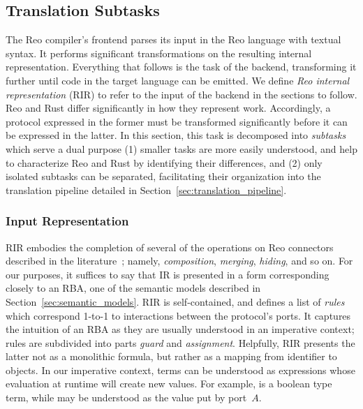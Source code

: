 \subsection{Translation Subtasks}
\label{sec:sub_tasks}
The Reo compiler's frontend parses its input in the Reo language with textual syntax. It performs significant transformations on the resulting internal representation. Everything that follows is the task of the backend, transforming it further until code in the target language can be emitted. We define \textit{Reo internal representation} (RIR) to refer to the input of the backend in the sections to follow. Reo and Rust differ significantly in how they represent work. Accordingly, a protocol expressed in the former must be transformed significantly before it can be expressed in the latter. In this section, this task is decomposed into \textit{subtasks} which serve a dual purpose (1) smaller tasks are more easily understood, and help to characterize Reo and Rust by identifying their differences, and (2) only isolated subtasks can be separated, facilitating their organization into the translation pipeline detailed in Section~\ref{sec:translation_pipeline}.

\subsubsection{Input Representation}
RIR embodies the completion of several of the operations on Reo connectors described in the literature~\cite{baier2006modeling, dokter2018rule}; namely, \textit{composition}, \textit{merging}, \textit{hiding}, and so on. For our purposes, it suffices to say that IR is presented in a form corresponding closely to an RBA, one of the semantic models described in Section~\ref{sec:semantic_models}. RIR is self-contained, and defines a list of \textit{rules} which correspond 1-to-1 to interactions between the protocol's ports. It captures the intuition of an RBA as they are usually understood in an imperative context; rules are subdivided into parts \textit{guard} and \textit{assignment}. Helpfully, RIR presents the latter not as a monolithic formula, but rather as a mapping from identifier to  objects. In our imperative context, terms can be understood as expressions whose evaluation at runtime will create new values. For example,  is a boolean type term, while  may be understood as the value put by port~$A$.

